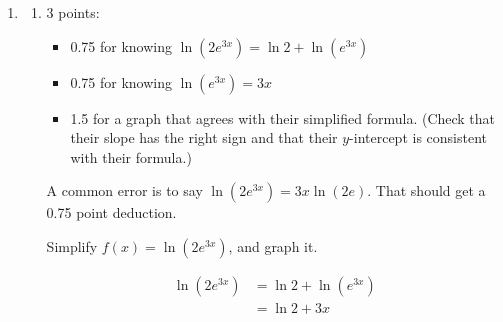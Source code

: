\documentclass{article}
\begin{document}
\begin{enumerate}
\begin{enumerate}[resume]
    \begin{solution}
      \begin{align*}
        \log_{10} \left(30 \sqrt{60} \right) 
        &= \log_{10} 30 + \log_{10} \sqrt{60} \\
        &= \log_{10} 30 + \tfrac{1}{2} \log_{10} 60 \\
        &= \log_{10} 3 + \log_{10} 10 
          + \tfrac{1}{2} (\log_{10} 2 + \log_{10} 3 + \log_{10} 10) \\
        &= \tfrac{1}{2}\log_{10} 2 + \tfrac{3}{2} \log_{10} 3 + 
        \tfrac{3}{2} \log_{10} 10 \\
        &= \boxed{\tfrac{1}{2} a + \tfrac{3}{2} b + \tfrac{3}{2}}
      \end{align*}
    \end{solution}

  \end{enumerate}

\item  

  \begin{enumerate}
  \item

    \begin{grading}
      3 points:
      \begin{itemize}[nosep]
      \item 0.75 for knowing $\ln ( 2 e^{3x} ) = \ln 2 + \ln (e^{3x})$
      \item 0.75 for knowing $\ln (e^{3x}) = 3x$
      \item 1.5 for a graph that agrees with their simplified formula. (Check that their slope has the right sign and that their $y$-intercept is consistent with their formula.) 
      \end{itemize}
      A common error is to say $\ln (2 e^{3x}) = 3x \ln (2e)$. That should get a 0.75 point deduction. 
    \end{grading}

    \begin{problem}[\vfill\newpage]
      Simplify $f(x) = \ln(2 e^{3x})$, and graph it. 
    \end{problem}

    \begin{solution}
      \begin{align*}
        \ln(2e^{3x}) &= \ln 2 + \ln(e^{3x}) \\
        &= \ln 2 + 3x
      \end{align*}
      \begin{center}
      \end{center}
    \end{solution}


\end{enumerate}
\end{enumerate}
\end{document}
